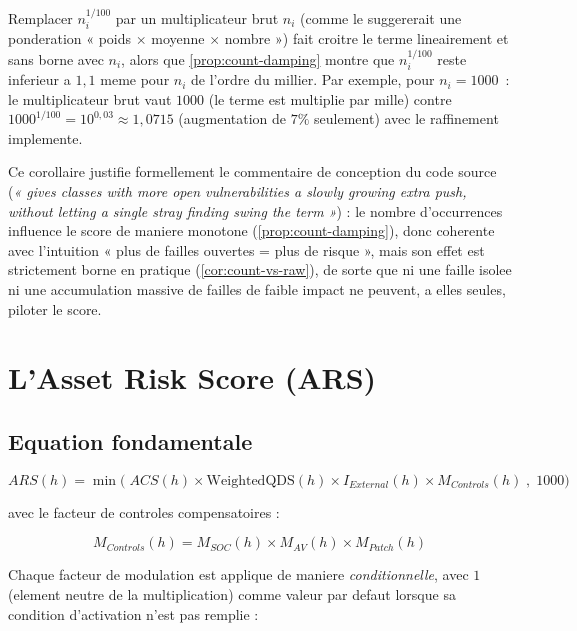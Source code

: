 \begin{corollaire}
\label{cor:count-vs-raw}
Remplacer $n_i^{1/100}$ par un multiplicateur brut $n_i$ (comme le suggererait une
ponderation « poids $\times$ moyenne $\times$ nombre ») fait croitre le terme
lineairement et sans borne avec $n_i$, alors que \cref{prop:count-damping} montre que
$n_i^{1/100}$ reste inferieur a $1{,}1$ meme pour $n_i$ de l'ordre du millier. Par
exemple, pour $n_i=1000$~: le multiplicateur brut vaut $1000$ (le terme est
multiplie par mille) contre $1000^{1/100}=10^{0{,}03}\approx 1{,}0715$
(augmentation de $7\%$ seulement) avec le raffinement implemente.
\end{corollaire}

Ce corollaire justifie formellement le commentaire de conception du code source
(\emph{« gives classes with more open vulnerabilities a slowly growing extra push,
without letting a single stray finding swing the term »}) : le nombre d'occurrences
influence le score de maniere monotone (\cref{prop:count-damping}), donc coherente
avec l'intuition « plus de failles ouvertes = plus de risque », mais son effet est
strictement borne en pratique (\cref{cor:count-vs-raw}), de sorte que ni une faille
isolee ni une accumulation massive de failles de faible impact ne peuvent, a elles
seules, piloter le score.

\section{L'Asset Risk Score (ARS)}

\subsection{Equation fondamentale}

\begin{equation}
ARS(h) = \min\Big(\; ACS(h)\times \mathrm{WeightedQDS}(h) \times I_{External}(h) \times M_{Controls}(h)\;,\;1000 \Big)
\label{eq:ars}
\end{equation}

avec le facteur de controles compensatoires :

\begin{equation}
M_{Controls}(h) = M_{SOC}(h)\times M_{AV}(h)\times M_{Patch}(h)
\label{eq:mcontrols}
\end{equation}

Chaque facteur de modulation est applique de maniere \emph{conditionnelle}, avec
$1$ (element neutre de la multiplication) comme valeur par defaut lorsque sa
condition d'activation n'est pas remplie :

